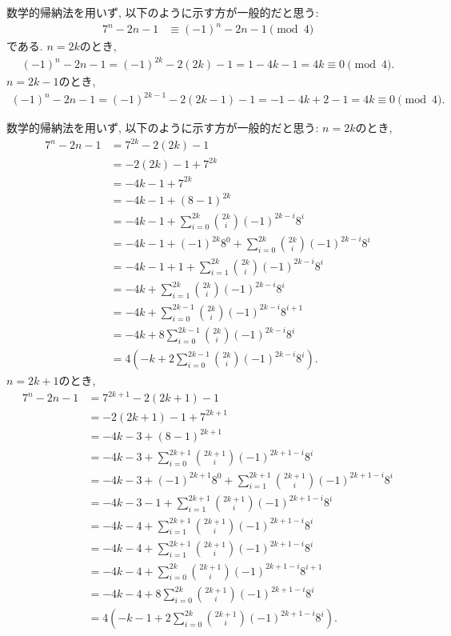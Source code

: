 \begin{rem}
  数学的帰納法を用いず, 以下のように示す方が一般的だと思う:
  \begin{align*}
    7^n-2n-1&\equiv (-1)^n-2n-1 \pmod{4}
  \end{align*}
  である. $n=2k$のとき,
  \begin{align*}
    (-1)^n-2n-1=(-1)^{2k}-2(2k)-1=1-4k-1=4k \equiv 0 \pmod{4}.
  \end{align*}
  $n=2k-1$のとき,
  \begin{align*}
    (-1)^n-2n-1=(-1)^{2k-1}-2(2k-1)-1=-1-4k+2-1=4k \equiv 0 \pmod{4}.
  \end{align*}
\end{rem}


\begin{rem}
  数学的帰納法を用いず, 以下のように示す方が一般的だと思う:
  $n=2k$のとき,
  \begin{align*}
    7^n-2n-1
    &=7^{2k}-2(2k)-1\\
    &=-2(2k)-1+7^{2k}\\
    &=-4k-1+7^{2k}\\
    &=-4k-1+(8-1)^{2k}\\
    &=-4k-1+\sum_{i=0}^{2k}\binom{2k}{i}(-1)^{2k-i}8^{i}\\
    &=-4k-1+(-1)^{2k}8^{0}+\sum_{i=0}^{2k}\binom{2k}{i}(-1)^{2k-i}8^{i}\\
    &=-4k-1+1+\sum_{i=1}^{2k}\binom{2k}{i}(-1)^{2k-i}8^{i}\\
    &=-4k+\sum_{i=1}^{2k}\binom{2k}{i}(-1)^{2k-i}8^{i}\\
    &=-4k+\sum_{i=0}^{2k-1}\binom{2k}{i}(-1)^{2k-i}8^{i+1}\\
    &=-4k+8\sum_{i=0}^{2k-1}\binom{2k}{i}(-1)^{2k-i}8^{i}\\
    &=4\left(-k+2\sum_{i=0}^{2k-1}\binom{2k}{i}(-1)^{2k-i}8^{i}\right).
  \end{align*}
  $n=2k+1$のとき,
  \begin{align*}
    7^n-2n-1
    &=7^{2k+1}-2(2k+1)-1\\
    &=-2(2k+1)-1+7^{2k+1}\\
    &=-4k-3+(8-1)^{2k+1}\\
    &=-4k-3+\sum_{i=0}^{2k+1}\binom{2k+1}{i}(-1)^{2k+1-i}8^{i}\\
    &=-4k-3+(-1)^{2k+1}8^{0}+\sum_{i=1}^{2k+1}\binom{2k+1}{i}(-1)^{2k+1-i}8^{i}\\
    &=-4k-3-1+\sum_{i=1}^{2k+1}\binom{2k+1}{i}(-1)^{2k+1-i}8^{i}\\
    &=-4k-4+\sum_{i=1}^{2k+1}\binom{2k+1}{i}(-1)^{2k+1-i}8^{i}\\
    &=-4k-4+\sum_{i=1}^{2k+1}\binom{2k+1}{i}(-1)^{2k+1-i}8^{i}\\
    &=-4k-4+\sum_{i=0}^{2k}\binom{2k+1}{i}(-1)^{2k+1-i}8^{i+1}\\
    &=-4k-4+8\sum_{i=0}^{2k}\binom{2k+1}{i}(-1)^{2k+1-i}8^{i}\\
    &=4\left(-k-1+2\sum_{i=0}^{2k}\binom{2k+1}{i}(-1)^{2k+1-i}8^{i}\right).
  \end{align*}
\end{rem}

